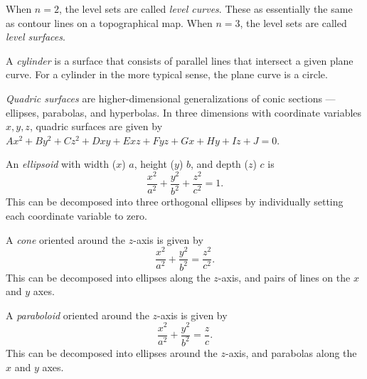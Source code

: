 \documentclass[12pt]{article}
\begin{document}
\begin{rmk}
    When $n = 2$, the level sets are called \emph{level curves}. These as essentially the same as contour lines on a topographical map. When $n=3$, the level sets are called \emph{level surfaces}.
\end{rmk}

\begin{defn}
    A \emph{cylinder} is a surface that consists of parallel lines that intersect a given plane curve. For a cylinder in the more typical sense, the plane curve is a circle.
\end{defn}

\begin{defn}
    \emph{Quadric surfaces} are higher-dimensional generalizations of conic sections --- ellipses, parabolas, and hyperbolas. In three dimensions with coordinate variables $x, y, z$, quadric surfaces are given by $Ax^2 + By^2 + Cz^2 + Dxy + Exz + Fyz + Gx + Hy + Iz + J = 0$.
\end{defn}

\begin{defn}
    An \emph{ellipsoid} with width ($x$) $a$, height ($y$) $b$, and depth ($z$) $c$ is \[\frac{x^2}{a^2} + \frac{y^2}{b^2} + \frac{z^2}{c^2} = 1.\] This can be decomposed into three orthogonal ellipses by individually setting each coordinate variable to zero.
\end{defn}

\begin{defn}
    A \emph{cone} oriented around the $z$-axis is given by \[\frac{x^2}{a^2} + \frac{y^2}{b^2} = \frac{z^2}{c^2}.\] This can be decomposed into ellipses along the $z$-axis, and pairs of lines on the $x$ and $y$ axes.
\end{defn}

\begin{defn}
    A \emph{paraboloid} oriented around the $z$-axis is given by \[\frac{x^2}{a^2} + \frac{y^2}{b^2} = \frac{z}{c}.\] This can be decomposed into ellipses around the $z$-axis, and parabolas along the $x$ and $y$ axes.
\end{defn}
\end{document}
